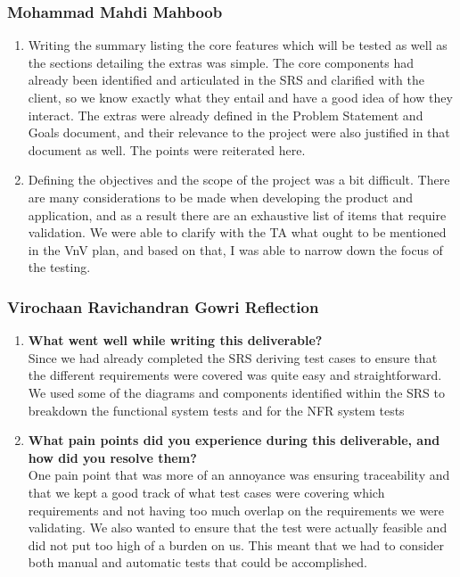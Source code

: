 \documentclass[12pt, titlepage]{article}
\begin{document}
\subsubsection*{Mohammad Mahdi Mahboob}
\begin{enumerate}[align=left,
  leftmargin=*,
  labelsep=1em,
  itemindent=0em, font=\bfseries]
  \item Writing the summary listing the core features which will be tested as well as the sections detailing the extras
    was simple. The core components had already been identified and articulated in the SRS and clarified with the
    client, so we know exactly what they entail and have a good idea of how they interact. The extras were already
    defined in the Problem Statement and Goals document, and their relevance to the project were also justified in that
    document as well. The points were reiterated here.
  \item Defining the objectives and the scope of the project was a bit difficult. There are many considerations to be
    made when developing the product and application, and as a result there are an exhaustive list of items that require
    validation. We were able to clarify with the TA what ought to be mentioned in the VnV plan, and based on that, I was
    able to narrow down the focus of the testing.
\end{enumerate}
\subsubsection*{Virochaan Ravichandran Gowri Reflection}
\begin{enumerate}
  \item \textbf{What went well while writing this deliverable?} \\
  Since we had already completed the SRS deriving test cases to ensure that the different requirements were covered was quite easy and straightforward. We used some of the diagrams and components identified within the SRS to breakdown the functional system tests and for the NFR system tests 
  \item \textbf{What pain points did you experience during this deliverable, and how did you resolve them?} \\
  One pain point that was more of an annoyance was ensuring traceability and that we kept a good track of what test cases were covering which requirements and not having too much overlap on the requirements we were validating. We also wanted to ensure that the test were actually feasible and did not put too high of a burden on us. This meant that we had to consider both manual and automatic tests that could be accomplished. 
\end{enumerate}
\end{document}
